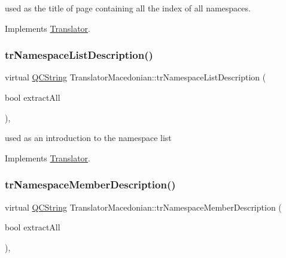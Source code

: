 used as the title of page containing all the index of all namespaces. 

Implements \mbox{\hyperlink{class_translator}{Translator}}.

\mbox{\label{class_translator_macedonian_ab69f332e2e27fff1abff98a313036cda}} 
\subsubsection{\texorpdfstring{trNamespaceListDescription()}{trNamespaceListDescription()}}
{\footnotesize\ttfamily virtual \mbox{\hyperlink{class_q_c_string}{Q\+C\+String}} Translator\+Macedonian\+::tr\+Namespace\+List\+Description (\begin{DoxyParamCaption}\item[{bool}]{extract\+All }\end{DoxyParamCaption})\hspace{0.3cm}{\ttfamily [inline]}, {\ttfamily [virtual]}}

used as an introduction to the namespace list 

Implements \mbox{\hyperlink{class_translator}{Translator}}.

\mbox{\label{class_translator_macedonian_aafe7c83f396335faf1051064b45dc9cb}} 
\subsubsection{\texorpdfstring{trNamespaceMemberDescription()}{trNamespaceMemberDescription()}}
{\footnotesize\ttfamily virtual \mbox{\hyperlink{class_q_c_string}{Q\+C\+String}} Translator\+Macedonian\+::tr\+Namespace\+Member\+Description (\begin{DoxyParamCaption}\item[{bool}]{extract\+All }\end{DoxyParamCaption})\hspace{0.3cm}{\ttfamily [inline]}, {\ttfamily [virtual]}}

